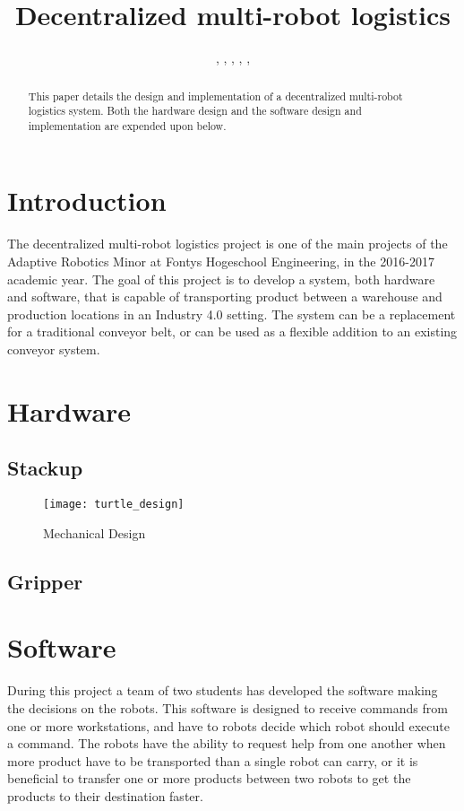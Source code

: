 \documentclass[10pt, journal]{IEEEtran}
\author{\IEEEauthorblockN{Remco Aarts}, 
 \IEEEauthorblockN{Jeroen van den Akker}, 
 \IEEEauthorblockN{Robert Delmaar}, 
 \IEEEauthorblockN{Bas Janssen},
 \IEEEauthorblockN{Addie Perenboom},
 \IEEEauthorblockN{Dimitri Waard}}
\title{Decentralized multi-robot logistics}
\begin{document}
\maketitle

\begin{abstract}
This paper details the design and implementation of a decentralized multi-robot logistics system. Both the hardware design and the software design and implementation are expended upon below.
\end{abstract}
\begin{IEEEkeywords}

\end{IEEEkeywords}

\section{Introduction}
The decentralized multi-robot logistics project is one of the main projects of the Adaptive Robotics Minor at Fontys Hogeschool Engineering, in the 2016-2017 academic year. The goal of this project is to develop a system, both hardware and software, that is capable of transporting product between a warehouse and production locations in an Industry 4.0 setting. The system can be a replacement for a traditional conveyor belt, or can be used as a flexible addition to an existing conveyor system.

\section{Hardware}

\subsection{Stackup}
\begin{figure}[htp]
\centering
\texttt{[image: turtle\_design]}
\caption{Mechanical Design}
\label{MechanicalDesign}
\end{figure}

\subsection{Gripper}
\lipsum[4]

\section{Software}
During this project a team of two students has developed the software making the decisions on the robots. This software is designed to receive commands from one or more workstations, and have to robots decide which robot should execute a command. The robots have the ability to request help from one another when more product have to be transported than a single robot can carry, or it is beneficial to transfer one or more products between two robots to get the products to their destination faster.
\end{document}
